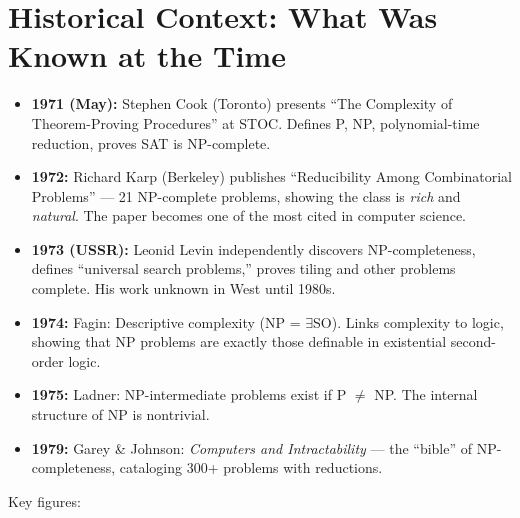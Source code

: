 \section{Historical Context: What Was Known at the Time}
\label{sec:np:context}

\begin{itemize}
\item \textbf{1971 (May):} Stephen Cook (Toronto) presents ``The Complexity of Theorem-Proving Procedures'' at STOC. Defines P, NP, polynomial-time reduction, proves SAT is NP-complete.
\item \textbf{1972:} Richard Karp (Berkeley) publishes ``Reducibility Among Combinatorial Problems'' — 21 NP-complete problems, showing the class is \emph{rich} and \emph{natural}. The paper becomes one of the most cited in computer science.
\item \textbf{1973 (USSR):} Leonid Levin independently discovers NP-completeness, defines ``universal search problems,'' proves tiling and other problems complete. His work unknown in West until 1980s.
\item \textbf{1974:} Fagin: Descriptive complexity (NP = $\exists$SO). Links complexity to logic, showing that NP problems are exactly those definable in existential second-order logic.
\item \textbf{1975:} Ladner: NP-intermediate problems exist if P $\neq$ NP. The internal structure of NP is nontrivial.
\item \textbf{1979:} Garey \& Johnson: \emph{Computers and Intractability} — the ``bible'' of NP-completeness, cataloging 300+ problems with reductions.
\end{itemize}

Key figures:

